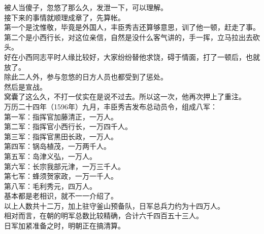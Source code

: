 \begin{multicols}{\theparacolNo}
被人当傻子，忽悠了那么久，发泄一下，可以理解。\\

接下来的事情就顺理成章了，先算帐。\\

第一个是沈惟敬，毕竟是外国人，丰臣秀吉还算够意思，训了他一顿，赶走了事。\\

第二个是小西行长，对这位亲信，自然是没什么客气讲的，手一挥，立马拉出去砍头。\\

好在小西同志平时人缘比较好，大家纷纷替他求饶，碍于情面，打了一顿后，也就放了。\\

除此二人外，参与忽悠的日方人员也都受到了惩处。\\

然后是宣战。\\

窝囊了这么久，不打一仗实在是说不过去。所以这一次，他再次押上了重注。\\

万历二十四年（1596年）九月，丰臣秀吉发布总动员令，组成八军：\\

第一军：指挥官加藤清正，一万人。\\

第二军：指挥官小西行长，一万四千人。\\

第三军：指挥官黑田长政，一万人。\\

第四军：锅岛植茂，一万两千人。\\

第五军：岛津义弘，一万人。\\

第六军：长宗我部元津，一万三千人。\\

第七军：蜂须贺家政，一万一千人。\\

第八军：毛利秀元，四万人。\\

基本都是老相识，就不一一介绍了。\\

以上人数共十二万，加上驻守釜山预备队，日军总兵力约为十四万人。\\

相对而言，在朝的明军总数比较精确，合计六千四百五十三人。\\

日军加紧准备之时，明朝正在搞清算。\\


\end{multicols}
